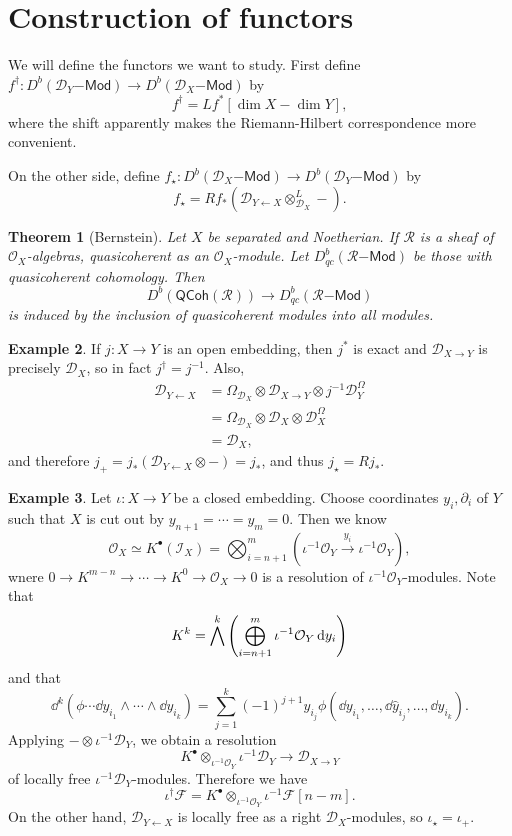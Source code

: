 \documentclass[leqno, openany]{memoir}
\newtheorem{thm}{Theorem}[section]
\theoremstyle{definition}
\newtheorem{exm}[thm]{Example}
\theoremstyle{remark}
\theoremstyle{plain}
\theoremstyle{definition}
\theoremstyle{remark}
\newcommand{\mc}[1]{\mathcal{#1}}
\newcommand{\ms}[1]{\mathsf{#1}}
\begin{document}
\section{Construction of functors}

We will define the functors we want to study. First define $f^{\dagger} \colon D^b(\mc{D}_Y\ms{-Mod}) \to D^b(\mc{D}_X\ms{-Mod})$ by
\[ f^{\dagger} = Lf^* [\dim X - \dim Y], \]
where the shift apparently makes the Riemann-Hilbert correspondence more convenient.

On the other side, define $f_{\star} \colon D^b(\mc{D}_X\ms{-Mod}) \to D^b(\mc{D}_Y\ms{-Mod})$ by
\[ f_{\star} = R f_* (\mc{D}_{Y \gets X} \otimes^L_{\mc{D}_X} -). \]

\begin{thm}[Bernstein]
    Let $X$ be separated and Noetherian. If $\mc{R}$ is a sheaf of $\mc{O}_X$-algebras, quasicoherent as an $\mc{O}_X$-module. Let $D^b_{qc} (\mc{R}\ms{-Mod})$ be those with quasicoherent cohomology. Then
    \[ D^b (\ms{QCoh}(\mc{R})) \to D^b_{qc} (\mc{R}\ms{-Mod}) \]
    is induced by the inclusion of quasicoherent modules into all modules.
\end{thm}

\begin{exm}
    If $j \colon X \to Y$ is an open embedding, then $j^*$ is exact and $\mc{D}_{X \to Y}$ is precisely $\mc{D}_X$, so in fact $j^{\dagger} = j^{-1}$. Also,
    \begin{align*}
        \mc{D}_{Y \gets X} &= \Omega_{\mc{D}_X} \otimes \mc{D}_{X \to Y} \otimes j^{-1} \mc{D}_Y^{\Omega} \\
        &= \Omega_{\mc{D}_X} \otimes \mc{D}_X \otimes \mc{D}_X^{\Omega} \\
        &= \mc{D}_X,
    \end{align*}
    and therefore $j_{+} = j_*(\mc{D}_{Y \gets X} \otimes -) = j_*$, and thus $j_{\star} = R j_*$.
\end{exm}

\begin{exm}
    Let $\iota \colon X \to Y$ be a closed embedding. Choose coordinates $y_i, \partial_i$ of $Y$ such that $X$ is cut out by $y_{n+1} = \cdots = y_m = 0$. Then we know
    \[ \mc{O}_X \simeq K^{\bullet} (\mc{I}_X) = \bigotimes_{i=n+1}^m (\iota^{-1} \mc{O}_Y \xrightarrow{y_i} \iota^{-1} \mc{O}_Y), \]
    wnere $0 \to K^{m-n} \to \cdots \to K^0 \to \mc{O}_X \to 0$ is a resolution of $\iota^{-1} \mc{O}_Y$-modules. Note that
    \[ K^k = \bigwedge^k \qty(\bigoplus_{i=n+1}^m \iota^{-1} \mc{O}_Y \dd{y_i}) \]
    and that
    \[ \dd^k (\phi \cdots \dd{y_{i_1}} \wedge \cdots \wedge \dd{y_{i_k}}) = \sum_{j=1}^k (-1)^{j+1} y_{i_j} \phi(\dd{y_{i_1}}, \ldots, \dd{\widehat{y}_{i_j}}, \ldots, \dd{y_{i_k}}). \]
    Applying $- \otimes \iota^{-1} \mc{D}_Y$, we obtain a resolution
    \[ K^{\bullet} \otimes_{\iota^{-1} \mc{O}_Y} \iota^{-1} \mc{D}_Y \to \mc{D}_{X \to Y} \]
    of locally free $\iota^{-1} \mc{D}_Y$-modules. Therefore we have
    \[ \iota^{\dagger} \mc{F} = K^{\bullet} \otimes_{\iota^{-1} \mc{O}_Y} \iota^{-1} \mc{F} [ n-m]. \]
    On the other hand, $\mc{D}_{Y \gets X}$ is locally free as a right $\mc{D}_X$-modules, so $\iota_{\star} = \iota_+$.
\end{exm}
\end{document}
